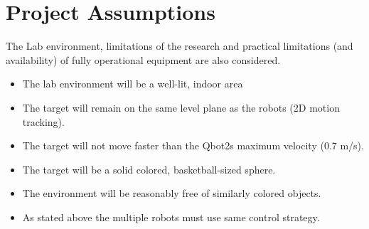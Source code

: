 \section{Project Assumptions}
The Lab environment, limitations of the research and practical limitations (and availability) of fully operational equipment are also considered.  

\begin{itemize}
\item	The lab environment will be a well-lit, indoor area
\item	The target will remain on the same level plane as the robots (2D motion tracking).  
\item	The target will not move faster than the Qbot2s maximum velocity (0.7 m/s).  
\item	The target will be a solid colored, basketball-sized sphere.  
\item	The environment will be reasonably free of similarly colored objects.  
\item	As stated above the multiple robots must use same control strategy.

\end{itemize}
